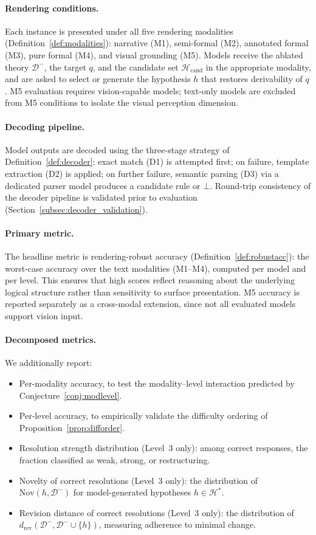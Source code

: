 \documentclass{article}
\theoremstyle{definition}
\newcommand{\Dm}{\mathcal{D}^{-}}
\newcommand{\Hcand}{\mathcal{H}_{\mathrm{cand}}}
\newcommand{\Hgold}{\mathcal{H}^{*}}
\newcommand{\Nov}{\mathrm{Nov}}
\begin{document}
\paragraph{Rendering conditions.} Each instance is presented under all five rendering modalities (Definition~\ref{def:modalities}): narrative (M1), semi-formal (M2), annotated formal (M3), pure formal (M4), and visual grounding (M5). Models receive the ablated theory $\Dm$, the target $q$, and the candidate set $\Hcand$ in the appropriate modality, and are asked to select or generate the hypothesis $h$ that restores derivability of $q$. M5 evaluation requires vision-capable models; text-only models are excluded from M5 conditions to isolate the visual perception dimension.

\paragraph{Decoding pipeline.} Model outputs are decoded using the three-stage strategy of Definition~\ref{def:decoder}: exact match (D1) is attempted first; on failure, template extraction (D2) is applied; on further failure, semantic parsing (D3) via a dedicated parser model produces a candidate rule or $\bot$. Round-trip consistency of the decoder pipeline is validated prior to evaluation (Section~\ref{subsec:decoder_validation}).

\paragraph{Primary metric.} The headline metric is rendering-robust accuracy (Definition~\ref{def:robustacc}): the worst-case accuracy over the text modalities (M1--M4), computed per model and per level. This ensures that high scores reflect reasoning about the underlying logical structure rather than sensitivity to surface presentation. M5 accuracy is reported separately as a cross-modal extension, since not all evaluated models support vision input.

\paragraph{Decomposed metrics.} We additionally report:
\begin{itemize}[nosep]
    \item Per-modality accuracy, to test the modality--level interaction predicted by Conjecture~\ref{conj:modlevel}.
    \item Per-level accuracy, to empirically validate the difficulty ordering of Proposition~\ref{prop:difforder}.
    \item Resolution strength distribution (Level~3 only): among correct responses, the fraction classified as weak, strong, or restructuring.
    \item Novelty of correct resolutions (Level~3 only): the distribution of $\Nov(h, \Dm)$ for model-generated hypotheses $h \in \Hgold$.
    \item Revision distance of correct resolutions (Level~3 only): the distribution of $d_{\mathrm{rev}}(\Dm, \Dm \cup \{h\})$, measuring adherence to minimal change.

\end{itemize}
\end{document}

